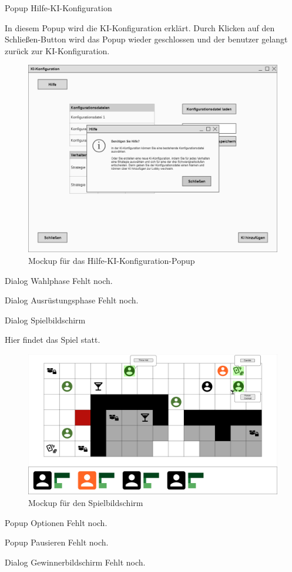 Popup \glqq{}Hilfe-KI-Konfiguration\grqq{}

In diesem Popup wird die KI-Konfiguration erklärt. Durch Klicken auf den Schließen-Button wird das Popup wieder geschlossen und der benutzer gelangt zurück zur KI-Konfiguration.

\begin{figure}[H]
  \centering
  \includegraphics[width=\textwidth]{Meilenstein03/Hilfe-KI-Konfiguration_Mockup.png}
  \caption{Mockup für das Hilfe-KI-Konfiguration-Popup}
\end{figure}

Dialog \glqq{}Wahlphase\grqq{}
Fehlt noch.

Dialog \glqq{}Ausrüstungsphase\grqq{}
Fehlt noch.

Dialog \glqq{}Spielbildschirm\grqq{}

Hier findet das Spiel statt.

\begin{figure}[H]
  \centering
  \includegraphics[width=\textwidth]{Meilenstein03/Game_Mockup.png}
  \caption{Mockup für den Spielbildschirm}
\end{figure}

Popup \glqq{}Optionen\grqq{}
Fehlt noch.

Popup \glqq{}Pausieren\grqq{}
Fehlt noch.

Dialog \glqq{}Gewinnerbildschirm\grqq{}
Fehlt noch.
